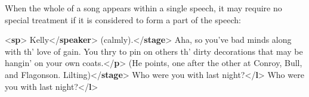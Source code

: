 When the whole of a song appears within a single speech, it may require no special treatment if it is considered to form a part of the speech: \par\bgroup{}\exampleFont \begin{shaded}\noindent\mbox{}{<\textbf{sp}>}\mbox{}\newline 
{}Kelly{</\textbf{speaker}>}\mbox{}\newline 
{}(calmly).{</\textbf{stage}>}\mbox{}\newline 
{}Aha, so you've bad minds along with th' love of gain.\mbox{}\newline 
\hspace*{1em}\hspace*{1em} You thry to pin on others th' dirty decorations that\mbox{}\newline 
\hspace*{1em}\hspace*{1em} may be hangin' on your own coats.{</\textbf{p}>}\mbox{}\newline 
{}(He points, one after the other at Conroy, Bull,\mbox{}\newline 
\hspace*{1em}\hspace*{1em} and Flagonson. Lilting){</\textbf{stage}>}\mbox{}\newline 
{}\mbox{}\newline 
\hspace*{1em}Who were you with last night?{</\textbf{l}>}\mbox{}\newline 
\hspace*{1em}Who were you with last night?{</\textbf{l}>}\mbox{}\newline 

\end{shaded}
